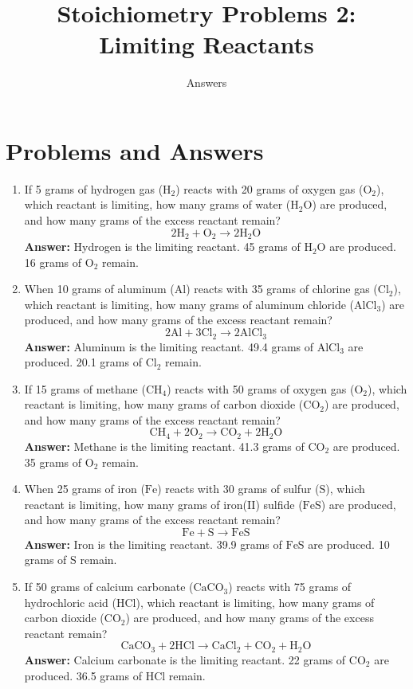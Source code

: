 \documentclass{article}
\title{Stoichiometry Problems 2: Limiting Reactants}
\author{Answers}
\date{}
\begin{document}
\maketitle

\section*{Problems and Answers}

\begin{enumerate}
    \item If 5 grams of hydrogen gas (\(\text{H}_2\)) reacts with 20 grams of oxygen gas (\(\text{O}_2\)), which reactant is limiting, how many grams of water (\(\text{H}_2\text{O}\)) are produced, and how many grams of the excess reactant remain?
    \[
    2\text{H}_2 + \text{O}_2 \rightarrow 2\text{H}_2\text{O}
    \]
    \textbf{Answer:} Hydrogen is the limiting reactant. 45 grams of \(\text{H}_2\text{O}\) are produced. 16 grams of \(\text{O}_2\) remain.

    \item When 10 grams of aluminum (\(\text{Al}\)) reacts with 35 grams of chlorine gas (\(\text{Cl}_2\)), which reactant is limiting, how many grams of aluminum chloride (\(\text{AlCl}_3\)) are produced, and how many grams of the excess reactant remain?
    \[
    2\text{Al} + 3\text{Cl}_2 \rightarrow 2\text{AlCl}_3
    \]
    \textbf{Answer:} Aluminum is the limiting reactant. 49.4 grams of \(\text{AlCl}_3\) are produced. 20.1 grams of \(\text{Cl}_2\) remain.

    \item If 15 grams of methane (\(\text{CH}_4\)) reacts with 50 grams of oxygen gas (\(\text{O}_2\)), which reactant is limiting, how many grams of carbon dioxide (\(\text{CO}_2\)) are produced, and how many grams of the excess reactant remain?
    \[
    \text{CH}_4 + 2\text{O}_2 \rightarrow \text{CO}_2 + 2\text{H}_2\text{O}
    \]
    \textbf{Answer:} Methane is the limiting reactant. 41.3 grams of \(\text{CO}_2\) are produced. 35 grams of \(\text{O}_2\) remain.

    \item When 25 grams of iron (\(\text{Fe}\)) reacts with 30 grams of sulfur (\(\text{S}\)), which reactant is limiting, how many grams of iron(II) sulfide (\(\text{FeS}\)) are produced, and how many grams of the excess reactant remain?
    \[
    \text{Fe} + \text{S} \rightarrow \text{FeS}
    \]
    \textbf{Answer:} Iron is the limiting reactant. 39.9 grams of \(\text{FeS}\) are produced. 10 grams of \(\text{S}\) remain.

    \item If 50 grams of calcium carbonate (\(\text{CaCO}_3\)) reacts with 75 grams of hydrochloric acid (\(\text{HCl}\)), which reactant is limiting, how many grams of carbon dioxide (\(\text{CO}_2\)) are produced, and how many grams of the excess reactant remain?
    \[
    \text{CaCO}_3 + 2\text{HCl} \rightarrow \text{CaCl}_2 + \text{CO}_2 + \text{H}_2\text{O}
    \]
    \textbf{Answer:} Calcium carbonate is the limiting reactant. 22 grams of \(\text{CO}_2\) are produced. 36.5 grams of \(\text{HCl}\) remain.
\end{enumerate}
\end{document}
